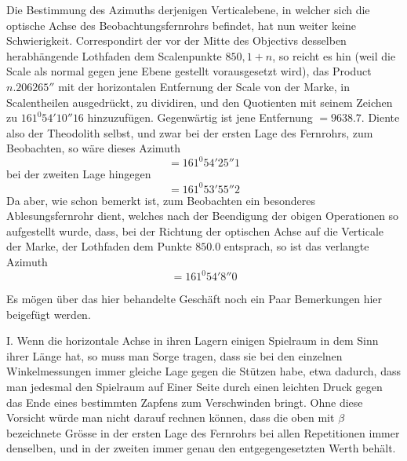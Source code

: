 Die Bestimmung des Azimuths derjenigen Verticalebene, in welcher sich die optische Achse des Beobachtungsfernrohrs befindet, hat nun weiter keine Schwierigkeit. Correspondirt der vor der Mitte des Objectivs desselben herabhängende Lothfaden dem Scalenpunkte $850{,}1+n$, so reicht es hin (weil die Scale als normal gegen jene Ebene gestellt vorausgesetzt wird), das Product $n.206265''$ mit der horizontalen Entfernung der Scale von der Marke, in Scalentheilen ausgedrückt, zu dividiren, und den Quotienten mit seinem Zeichen zu $161^0 54'10''16$ hinzuzufügen. Gegenwärtig ist jene Entfernung $=9638.7$. Diente also der Theodolith selbst, und zwar bei der ersten Lage des Fernrohrs, zum Beobachten, so wäre dieses Azimuth
\[
=161^0 54'25''1
\]
bei der zweiten Lage hingegen
\[
=161^0 53'55''2
\]
Da aber, wie schon bemerkt ist, zum Beobachten ein besonderes Ablesungsfernrohr dient, welches nach der Beendigung der obigen Operationen so aufgestellt wurde, dass, bei der Richtung der optischen Achse auf die Verticale der Marke, der Lothfaden dem Punkte $850.0$ entsprach, so ist das verlangte Azimuth
\[
=161^0 54'8''0
\]

Es mögen über das hier behandelte Geschäft noch ein Paar Bemerkungen hier beigefügt werden.

I. Wenn die horizontale Achse in ihren Lagern einigen Spielraum in dem Sinn ihrer Länge hat, so muss man Sorge tragen, dass sie bei den einzelnen Winkelmessungen immer gleiche Lage gegen die Stützen habe, etwa dadurch, dass man jedesmal den Spielraum auf Einer Seite durch einen leichten Druck gegen das Ende eines bestimmten Zapfens zum Verschwinden bringt. Ohne diese Vorsicht würde man nicht darauf rechnen können, dass die oben mit $\beta$ bezeichnete Grösse in der ersten Lage des Fernrohrs bei allen Repetitionen immer denselben, und in der zweiten immer genau den entgegengesetzten Werth behält.

